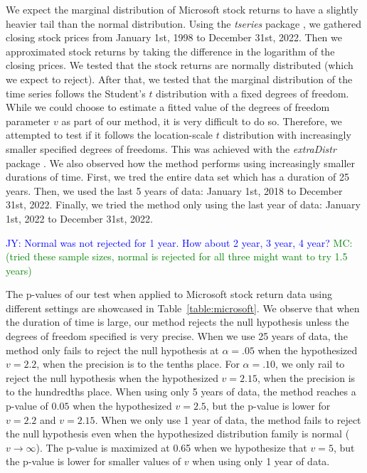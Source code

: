 \documentclass[12pt, titlepage, letterpaper]{article}
\newcommand{\jy}[1]{\textcolor{blue}{JY: #1}}
\newcommand{\mc}[1]{\textcolor{green}{MC: (#1)}}
\begin{document}
{We expect the marginal distribution of Microsoft stock returns to have a 
slightly
heavier tail than the normal distribution. Using the \textsl{tseries} package 
\citep{tseries}, 
we gathered closing stock prices from January 1st, 1998 to December 31st, 2022.
Then we approximated stock returns by taking the difference in the logarithm 
of the closing prices.
We tested that the stock returns are normally
distributed (which we expect to reject).  After that, we tested that the
marginal distribution of the time series follows the Student's $t$ distribution
with a fixed degrees of freedom.
While we 
could choose to estimate a fitted value of the degrees of freedom parameter $v$
as
part of our method, it is very difficult to do so. Therefore, we attempted to
test 
if it follows
the location-scale $t$ distribution with increasingly smaller specified degrees 
of freedoms. This was achieved with the \textsl{extraDistr} 
package \citep{extraDistr}. We
also observed how the method performs using increasingly smaller durations of
time. First, we tred the entire data set which has a duration of 25 years. Then,
we used the last 5 years of data: January 1st, 2018 to December 31st, 2022.
Finally, we tried the method only using the last year of data: January 1st, 2022
to December 31st, 2022.




\jy{Normal was not rejected for 1 year. How about 2 year, 3 year, 4 year?}
\mc{tried these sample sizes, normal is rejected for all three might want to
try 1.5 years}

The p-values of our test when applied to Microsoft stock return data using
different settings are showcased in Table~\ref{table:microsoft}.
We observe that when the duration of time is large, our method rejects the null
hypothesis unless the degrees of freedom specified is very precise. When
we use 25 years of data, the method
only fails to reject the null hypothesis at $\alpha = .05$ when 
the hypothesized $v = 2.2$, when 
the precision
is to the tenths place. For $\alpha = .10$, we only rail to reject the null 
hypothesis when the hypothesized $v = 2.15$, when the precision is to the 
hundredths place.
When using only 5 years of data, the method reaches a p-value of 
$0.05$ when the hypothesized $v = 2.5$, but the p-value is
lower for $v = 2.2$ and $v = 2.15$.
When we only use 1 year of data, the method fails to reject the null hypothesis
even when the hypothesized distribution family is normal ($v \to \infty$). The
p-value is maximized at 0.65 when we hypothesize that $v = 5$, but the p-value 
is lower for smaller values of $v$ when using only 1 year of data.


}
\end{document}

